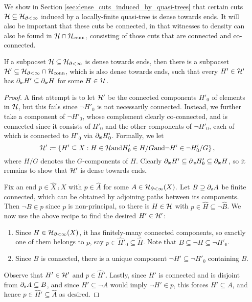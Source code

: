 \documentclass[reqno]{amsart}
\begin{document}
    We show in Section \ref{sec:dense_cuts_induced_by_quasi-trees} that certain cuts $\mathcal{H}\subseteq\mathcal{H}_{\partial<\infty}$ induced by a locally-finite quasi-tree is dense towards ends. It will also be important that these cuts be connected, in that witnesses to density can also be found in $\mathcal{H}\cap\mathcal{H}_\mathrm{conn}$, consisting of those cuts that are connected and co-connected.

    \begin{lemma}\label{lem:connected_witness_to_density}
        If a subpocset $\mathcal{H}\subseteq\mathcal{H}_{\partial<\infty}$ is dense towards ends, then there is a subpocset $\mathcal{H}'\subseteq\mathcal{H}_{\partial<\infty}\cap\mathcal{H}_\mathrm{conn}$, which is also dense towards ends, such that every $H'\in\mathcal{H}'$ has $\partial_\mathsf{ie}H'\subseteq\partial_\mathsf{ie}H$ for some $H\in\mathcal{H}$.
    \end{lemma}
    \begin{proof}
        A first attempt is to let $\mathcal{H}'$ be the connected components $H'_0$ of elements in $\mathcal{H}$, but this fails since $\lnot H'_0$ is not necessarily connected. Instead, we further take a component of $\lnot H'_0$, whose complement clearly co-connected, and is connected since it consists of $H'_0$ and the other components of $\lnot H'_0$, each of which is connected to $H'_0$ via $\partial_\mathsf{ie}H'_0$. Formally, we let
        \begin{equation*}
            \mathcal{H}'\coloneqq\left\{H'\subseteq X: H\in\mathcal{H}\mathrm{ and }H'_0\in H/G\mathrm{ and }\lnot H'\in\lnot H'_0/G\right\},
        \end{equation*}
        where $H/G$ denotes the $G$-components of $H$. Clearly $\partial_\mathsf{ie}H'\subseteq\partial_\mathsf{ie}H'_0\subseteq\partial_\mathsf{ie}H$, so it remains to show that $\mathcal{H}'$ is dense towards ends.

        Fix an end $p\in\widehat{X}\comp X$ with $p\in\widehat{A}$ for some $A\in\mathcal{H}_{\partial<\infty}(X)$. Let $B\supseteq\partial_\mathsf{v}A$ be finite connected, which can be obtained by adjoining paths between its components. Then $\lnot B\in p$ since $p$ is non-principal, so there is $H\in\mathcal{H}$ with $p\in\widehat{H}\subseteq\lnot\widehat{B}$. We now use the above recipe to find the desired $H'\in\mathcal{H}'$:
            \begin{enumerate}
                \item Since $H\in\mathcal{H}_{\partial<\infty}(X)$, it has finitely-many connected components, so exactly one of them belongs to $p$, say $p\in\widehat{H}'_0\subseteq\widehat{H}$. Note that $B\subseteq\lnot H\subseteq\lnot H'_0$.
                \item Since $B$ is connected, there is a unique component $\lnot H'\subseteq\lnot H'_0$ containing $B$.
            \end{enumerate}
        Observe that $H'\in\mathcal{H}'$ and $p\in\widehat{H}'$. Lastly, since $H'$ is connected and is disjoint from $\partial_\mathsf{v}A\subseteq B$, and since $H'\subseteq\lnot A$ would imply $\lnot H'\in p$, this forces $H'\subseteq A$, and hence $p\in\widehat{H}'\subseteq\widehat{A}$ as desired.
    \end{proof}
\end{document}
